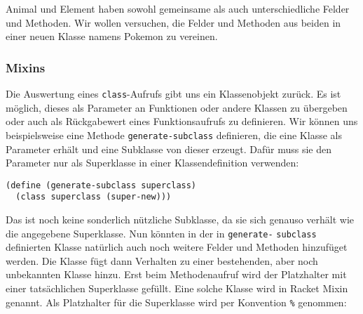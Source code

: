 Animal und Element haben sowohl gemeinsame als auch unterschiedliche Felder und Methoden. Wir wollen versuchen, die Felder und Methoden aus beiden in einer neuen Klasse namens Pokemon zu vereinen. 



\subsubsection{Mixins}
Die Auswertung eines \texttt{class}-Aufrufs gibt uns ein Klassenobjekt zurück. Es ist möglich, dieses als Parameter an Funktionen oder andere Klassen zu übergeben oder auch als Rückgabewert eines Funktionsaufrufs zu definieren. Wir können uns beispielsweise eine Methode \texttt{generate-subclass} definieren, die eine Klasse als Parameter erhält und eine Subklasse von dieser erzeugt. Dafür muss sie den Parameter nur als Superklasse in einer Klassendefinition verwenden:

\begin{lstlisting}
(define (generate-subclass superclass)
  (class superclass (super-new)))
\end{lstlisting} 

Das ist noch keine sonderlich nützliche Subklasse, da sie sich genauso verhält wie die angegebene Superklasse.
% 
% 
% 
% 
% 
Nun könnten in der in \texttt{generate-} \texttt{subclass} definierten Klasse natürlich auch noch weitere Felder und Methoden hinzufüget werden. Die Klasse fügt dann Verhalten zu einer bestehenden, aber noch unbekannten Klasse hinzu. Erst beim Methodenaufruf wird der Platzhalter mit einer tatsächlichen Superklasse gefüllt. Eine solche Klasse wird in Racket Mixin genannt. Als Platzhalter für die Superklasse wird per Konvention \texttt{\%} genommen:

